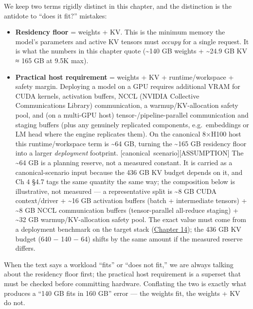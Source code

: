 We keep two terms rigidly distinct in this chapter, and the distinction
is the antidote to ``does it fit?'' mistakes:

\begin{itemize}
\tightlist
\item
  \textbf{Residency floor} = weights + KV. This is the minimum memory
  the model's parameters and active KV tensors must \emph{occupy} for a
  single request. It is what the numbers in this chapter quote
  (\textasciitilde140 GB weights + \textasciitilde24.9 GB KV ≈ 165 GB at
  9.5K max).
\item
  \textbf{Practical host requirement} = weights + KV + runtime/workspace
  + safety margin. Deploying a model on a GPU requires additional VRAM
  for CUDA kernels, activation buffers, NCCL (NVIDIA Collective
  Communications Library) communication, a warmup/KV-allocation safety
  pool, and (on a multi-GPU host) tensor-/pipeline-parallel
  communication and staging buffers (plus any genuinely replicated
  components, e.g.~embeddings or LM head where the engine replicates
  them). On the canonical 8×H100 host this runtime/workspace term is
  \textasciitilde64 GB, turning the \textasciitilde165 GB residency
  floor into a larger \emph{deployment} footprint. \mbox{{[}canonical
  scenario{]}}\hspace{0pt}\mbox{{[}ASSUMPTION{]}} The \textasciitilde64 GB is a planning
  reserve, not a measured constant. It is carried as a
  canonical-scenario input because the 436 GB KV budget depends on it,
  and Ch 4 §4.7 tags the same quantity the same way; the composition
  below is illustrative, not measured --- a representative split is
  \textasciitilde8 GB CUDA context/driver + \textasciitilde16 GB
  activation buffers (batch + intermediate tensors) + \textasciitilde8
  GB NCCL communication buffers (tensor-parallel all-reduce staging) +
  \textasciitilde32 GB warmup/KV-allocation safety pool. The exact value
  must come from a deployment benchmark on the target stack (\hyperref[chap:14]{Chapter 14}); the 436 GB KV budget (640 − 140 − 64) shifts by the same amount
  if the measured reserve differs.
\end{itemize}

When the text says a workload ``fits'' or ``does not fit,'' we are
always talking about the residency floor first; the practical host
requirement is a superset that must be checked before committing
hardware. Conflating the two is exactly what produces a ``140 GB fits in
160 GB'' error --- the weights fit, the weights + KV do not.

